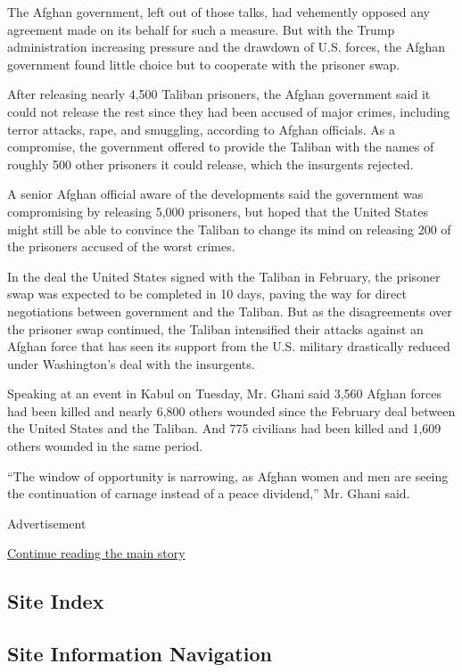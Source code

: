The Afghan government, left out of those talks, had vehemently opposed
any agreement made on its behalf for such a measure. But with the Trump
administration increasing pressure and the drawdown of U.S. forces, the
Afghan government found little choice but to cooperate with the prisoner
swap.

After releasing nearly 4,500 Taliban prisoners, the Afghan government
said it could not release the rest since they had been accused of major
crimes, including terror attacks, rape, and smuggling, according to
Afghan officials. As a compromise, the government offered to provide the
Taliban with the names of roughly 500 other prisoners it could release,
which the insurgents rejected.

A senior Afghan official aware of the developments said the government
was compromising by releasing 5,000 prisoners, but hoped that the United
States might still be able to convince the Taliban to change its mind on
releasing 200 of the prisoners accused of the worst crimes.

In the deal the United States signed with the Taliban in February, the
prisoner swap was expected to be completed in 10 days, paving the way
for direct negotiations between government and the Taliban. But as the
disagreements over the prisoner swap continued, the Taliban intensified
their attacks against an Afghan force that has seen its support from the
U.S. military drastically reduced under Washington's deal with the
insurgents.

Speaking at an event in Kabul on Tuesday, Mr. Ghani said 3,560 Afghan
forces had been killed and nearly 6,800 others wounded since the
February deal between the United States and the Taliban. And 775
civilians had been killed and 1,609 others wounded in the same period.

``The window of opportunity is narrowing, as Afghan women and men are
seeing the continuation of carnage instead of a peace dividend,'' Mr.
Ghani said.

Advertisement

\protect\hyperlink{after-bottom}{Continue reading the main story}

\hypertarget{site-index}{%
\subsection{Site Index}\label{site-index}}

\hypertarget{site-information-navigation}{%
\subsection{Site Information
Navigation}\label{site-information-navigation}}

